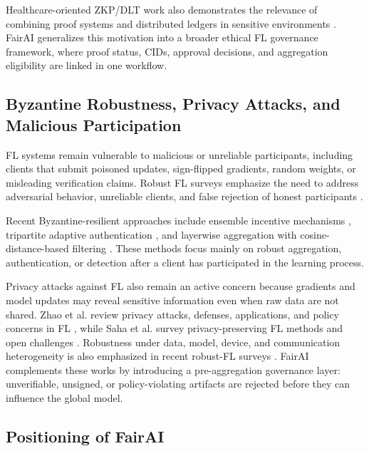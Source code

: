 \documentclass[futureinternet,article,submit,pdftex,moreauthors]{Definitions/mdpi}
\begin{document}
Healthcare-oriented ZKP/DLT work also demonstrates the relevance of combining proof systems and distributed ledgers in sensitive environments \cite{intro_12}. FairAI generalizes this motivation into a broader ethical FL governance framework, where proof status, CIDs, approval decisions, and aggregation eligibility are linked in one workflow.

\subsection{Byzantine Robustness, Privacy Attacks, and Malicious Participation}
\label{subsec:rw-robustness}

FL systems remain vulnerable to malicious or unreliable participants, including clients that submit poisoned updates, sign-flipped gradients, random weights, or misleading verification claims. Robust FL surveys emphasize the need to address adversarial behavior, unreliable clients, and false rejection of honest participants \cite{intro_13}. 

Recent Byzantine-resilient approaches include ensemble incentive mechanisms \cite{rw_26}, tripartite adaptive authentication \cite{rw_27}, and layerwise aggregation with cosine-distance-based filtering \cite{rw_28}. These methods focus mainly on robust aggregation, authentication, or detection after a client has participated in the learning process.

Privacy attacks against FL also remain an active concern because gradients and model updates may reveal sensitive information even when raw data are not shared. Zhao et al. review privacy attacks, defenses, applications, and policy concerns in FL \cite{rw_29}, while Saha et al. survey privacy-preserving FL methods and open challenges \cite{rw_30}. Robustness under data, model, device, and communication heterogeneity is also emphasized in recent robust-FL surveys \cite{rw_31}. FairAI complements these works by introducing a pre-aggregation governance layer: unverifiable, unsigned, or policy-violating artifacts are rejected before they can influence the global model.

\subsection{Positioning of FairAI}
\label{subsec:rw-positioning}
\end{document}
